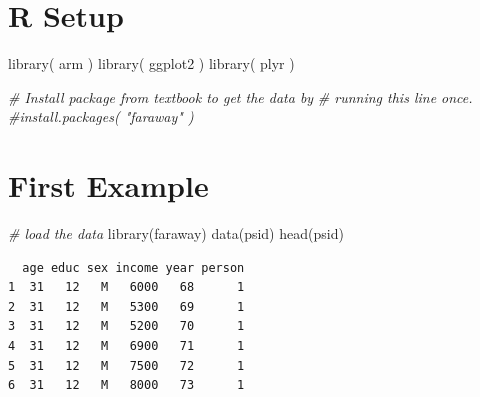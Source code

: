 \documentclass[
  letterpaper,
  DIV=11,
  numbers=noendperiod]{scrreprt}
\newenvironment{Shaded}{\begin{snugshade}}{\end{snugshade}}
\newcommand{\AttributeTok}[1]{\textcolor[rgb]{0.49,0.56,0.16}{#1}}
\newcommand{\CommentTok}[1]{\textcolor[rgb]{0.38,0.63,0.69}{\textit{#1}}}
\newcommand{\DecValTok}[1]{\textcolor[rgb]{0.25,0.63,0.44}{#1}}
\newcommand{\FunctionTok}[1]{\textcolor[rgb]{0.02,0.16,0.49}{#1}}
\newcommand{\NormalTok}[1]{\textcolor[rgb]{0.00,0.44,0.13}{#1}}
\newcommand{\OtherTok}[1]{\textcolor[rgb]{0.00,0.44,0.13}{#1}}
\newcommand{\SpecialCharTok}[1]{\textcolor[rgb]{0.25,0.44,0.63}{#1}}
\begin{document}
\hypertarget{r-setup-3}{%
\section{R Setup}\label{r-setup-3}}

\begin{Shaded}
\begin{Highlighting}[]
\FunctionTok{library}\NormalTok{( arm )}
\FunctionTok{library}\NormalTok{( ggplot2 )}
\FunctionTok{library}\NormalTok{( plyr )}

\CommentTok{\# Install package from textbook to get the data by }
\CommentTok{\# running this line once.}
\CommentTok{\#install.packages( "faraway" )}
\end{Highlighting}
\end{Shaded}

\hypertarget{first-example}{%
\section{First Example}\label{first-example}}

\begin{Shaded}
\begin{Highlighting}[]
\CommentTok{\# load the data}
\FunctionTok{library}\NormalTok{(faraway)}
\FunctionTok{data}\NormalTok{(psid)}
\FunctionTok{head}\NormalTok{(psid)}
\end{Highlighting}
\end{Shaded}

\begin{verbatim}
  age educ sex income year person
1  31   12   M   6000   68      1
2  31   12   M   5300   69      1
3  31   12   M   5200   70      1
4  31   12   M   6900   71      1
5  31   12   M   7500   72      1
6  31   12   M   8000   73      1
\end{verbatim}

\begin{Shaded}
\end{Shaded}
\end{document}
